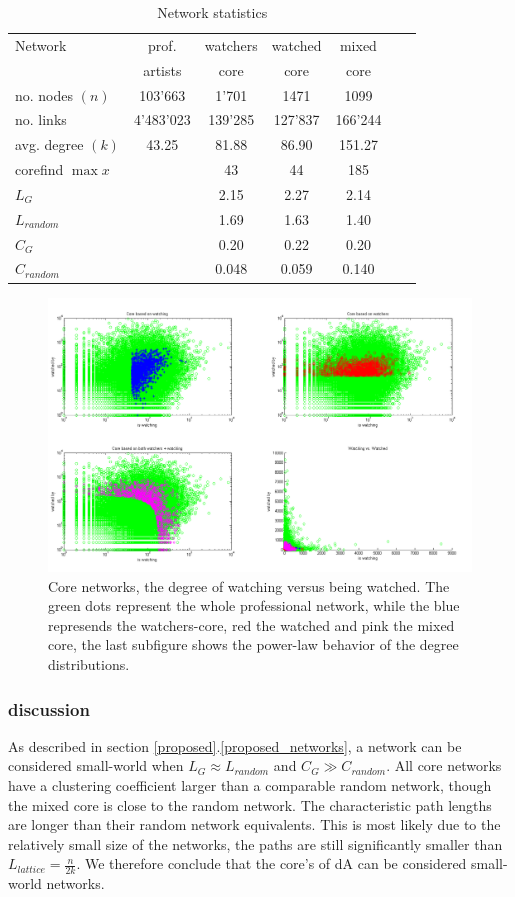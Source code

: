 \begin{table}[htb]
    \centering
    \begin{tabular}
        { | l | c | c | c | c | c | c|} 
        \hline
        Network &  prof.  & watchers & watched & mixed\\
	            &  artists & core & core & core \\
        \hline
	no. nodes $(n)$& 103'663 & 1'701 & 1471 & 1099 \\
	no. links & 4'483'023 & 139'285 & 127'837  & 166'244 \\
	avg. degree $(k)$& 43.25 & 81.88 & 86.90 & 151.27 \\
	corefind $\max x$ & & 43 & 44 & 185\\
	$L_G$ & & 2.15 & 2.27 & 2.14 \\
	$L_{random}$ & & 1.69 & 1.63 & 1.40 \\
	$C_G$ & & 0.20 & 0.22 & 0.20 \\
	$C_{random}$ & & 0.048 & 0.059 & 0.140 \\
	\hline
    \end{tabular}
    \caption{Network statistics}
    \label{tab:netstatistics}
\end{table}


\begin{figure}[htb]
  \centering
  \includegraphics[width=1\linewidth]{img/core.png}
  \caption{Core networks, the degree of watching versus being watched.  The green dots represent the whole professional network, while the blue represends the watchers-core, red the watched and pink the mixed core, the last subfigure shows the power-law behavior of the degree distributions.}
  \label{fig:results_core}
\end{figure}
\subsubsection{discussion}
As described in section \ref{proposed}.\ref{proposed_networks}, a network can be considered small-world when $L_G\approx L_{random}$ and $C_G \gg C_{random}$. All core networks have a clustering coefficient larger than a comparable random network, though the mixed core is close to the random network. The characteristic path lengths are longer than their random network equivalents. This is most likely due to the relatively small size of the networks, the paths are still significantly smaller than $L_{lattice}=\frac{n}{2k}$. We therefore conclude that the core's of dA can be considered small-world networks.  
